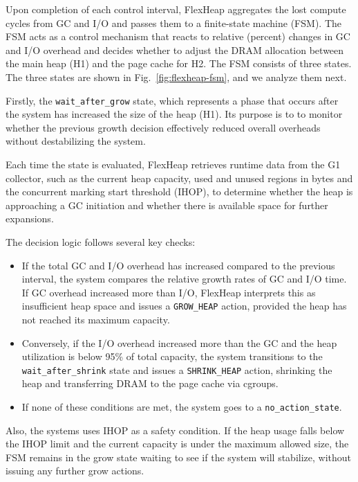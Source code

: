Upon completion of each control interval, FlexHeap aggregates the lost compute
cycles from GC and I/O and passes them to a finite-state machine (FSM). The FSM
acts as a control mechanism that reacts to relative (percent) changes in GC and
I/O overhead and decides whether to adjust the DRAM allocation between the
main heap (H1) and the page cache for H2. The FSM consists of three states. The
three states are shown in Fig.~\ref{fig:flexheap-fsm}, and we analyze them next.


Firstly, the \texttt{wait\_after\_grow} state, which represents a phase that occurs after
the system has increased the size of the heap (H1). Its purpose is to
to monitor whether the previous growth decision effectively
reduced overall overheads without destabilizing the system.

Each time the state is evaluated, FlexHeap retrieves runtime data from the G1 collector,
such as the current heap capacity, used and unused regions in bytes and the concurrent marking
start threshold (IHOP), to determine whether the heap is approaching
a GC initiation and whether there is available space for further expansions.

The decision logic follows several key checks:
\begin{itemize}
	\item If the total GC and I/O overhead has increased compared to the previous interval, the system
	      compares the relative growth rates of GC and I/O time. If GC overhead increased more than I/O,
	      FlexHeap interprets this as insufficient heap space and issues a \texttt{GROW\_HEAP} action,
	      provided the heap has not reached its maximum capacity.
	\item Conversely, if the I/O overhead increased more than the GC and the heap utilization is below 95\% of
	      total capacity, the system transitions to the \texttt{wait\_after\_shrink} state and issues a
	      \texttt{SHRINK\_HEAP} action, shrinking the heap and transferring DRAM to the page cache via cgroups.
	\item If none of these conditions are met, the system goes to a \texttt{no\_action\_state}.
\end{itemize}

Also, the systems uses IHOP as a safety condition. If the heap usage falls
below the IHOP limit and the current capacity is under the maximum allowed
size, the FSM remains in the grow state waiting to see if the system will
stabilize, without issuing any further grow actions.

